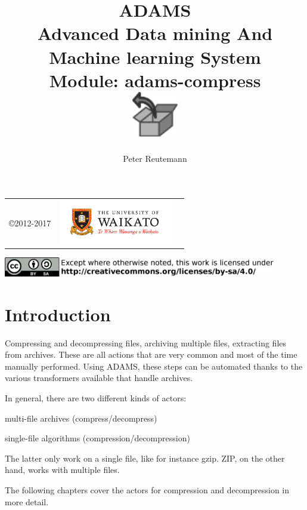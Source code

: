 \documentclass[a4paper]{book}
\title{
  \textbf{ADAMS} \\
  {\Large \textbf{A}dvanced \textbf{D}ata mining \textbf{A}nd \textbf{M}achine
  learning \textbf{S}ystem} \\
  {\Large Module: adams-compress} \\
  \vspace{1cm}
  \includegraphics[width=2cm]{images/compress-module.png} \\
}
\author{
  Peter Reutemann
}
\begin{document}
\begin{titlepage}
\maketitle

\thispagestyle{empty}
\center
\begin{table}[b]
	\begin{tabular}{c l l}
		\parbox[c][2cm]{2cm}{\copyright 2012-2017} &
		\parbox[c][2cm]{5cm}{\includegraphics[width=5cm]{images/coat_of_arms.pdf}} \\
	\end{tabular}
	\includegraphics[width=12cm]{images/cc.png} \\
\end{table}

\end{titlepage}

\tableofcontents

\chapter{Introduction}
Compressing and decompressing files, archiving multiple files, extracting files
from archives. These are all actions that are very common and most of the time
manually performed. Using ADAMS, these steps can be automated thanks to the 
various transformers available that handle archives.

In general, there are two different kinds of actors:
\begin{tight_itemize}
  \item multi-file archives (compress/decompress)
  \item single-file algorithms (compression/decompression)
\end{tight_itemize}
The latter only work on a single file, like for instance gzip. ZIP, on the
other hand, works with multiple files.

The following chapters cover the actors for compression and decompression in 
more detail.
\end{document}
